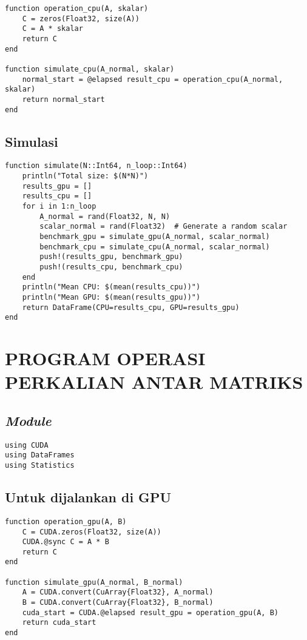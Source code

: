 \begin{lstlisting}
function operation_cpu(A, skalar)
    C = zeros(Float32, size(A))
    C = A * skalar
    return C
end

function simulate_cpu(A_normal, skalar)
    normal_start = @elapsed result_cpu = operation_cpu(A_normal, skalar)
    return normal_start
end
\end{lstlisting}

\section{Simulasi}

\begin{lstlisting}
function simulate(N::Int64, n_loop::Int64)
    println("Total size: $(N*N)")
    results_gpu = []
    results_cpu = []
    for i in 1:n_loop
        A_normal = rand(Float32, N, N)
        scalar_normal = rand(Float32)  # Generate a random scalar
        benchmark_gpu = simulate_gpu(A_normal, scalar_normal)
        benchmark_cpu = simulate_cpu(A_normal, scalar_normal)
        push!(results_gpu, benchmark_gpu)
        push!(results_cpu, benchmark_cpu)
    end
    println("Mean CPU: $(mean(results_cpu))")
    println("Mean GPU: $(mean(results_gpu))")
    return DataFrame(CPU=results_cpu, GPU=results_gpu)
end
\end{lstlisting}

\chapter{PROGRAM OPERASI PERKALIAN ANTAR MATRIKS}
\label{appx:multiplication_matrix_matrix}

\section{\emph{Module}}

\begin{lstlisting}
using CUDA
using DataFrames
using Statistics
\end{lstlisting}

\section{Untuk dijalankan di GPU}

\begin{lstlisting}
function operation_gpu(A, B)
    C = CUDA.zeros(Float32, size(A))
    CUDA.@sync C = A * B
    return C
end

function simulate_gpu(A_normal, B_normal)
    A = CUDA.convert(CuArray{Float32}, A_normal)
    B = CUDA.convert(CuArray{Float32}, B_normal)
    cuda_start = CUDA.@elapsed result_gpu = operation_gpu(A, B)
    return cuda_start
end
\end{lstlisting}

